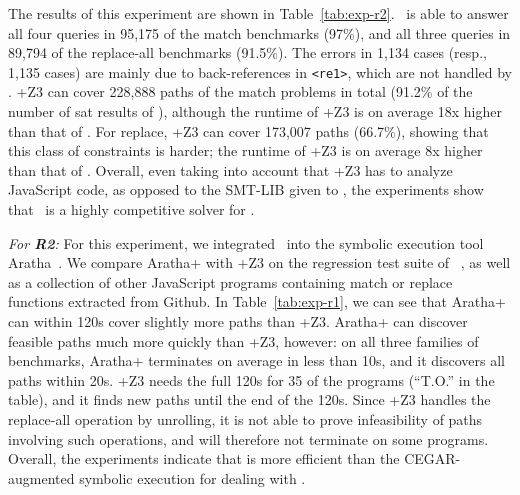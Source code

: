 The results of this experiment are shown in
Table~\ref{tab:exp-r2}. \ostrich\ is able to answer all four queries
in 95,175 of the match benchmarks (97\%), and all three queries in
89,794 of the replace-all benchmarks (91.5\%). The errors in 1,134
cases (resp., 1,135 cases) are mainly due to back-references in
\verb!<re1>!, which are not handled by \ostrich. \expose{}+Z3 can
cover 228,888 paths of the match problems in total (91.2\% of the
number of sat results of \ostrich), although the runtime of
\expose{}+Z3 is on average 18x higher than that of \ostrich. For
replace, \expose{}+Z3 can cover 173,007 paths (66.7\%), showing that
this class of constraints is harder; the runtime of \expose{}+Z3 is on
average 8x higher than that of \ostrich.  Overall, even taking into
account that \expose{}+Z3 has to analyze JavaScript code, as opposed
to the SMT-LIB given to \ostrich, the experiments show that \ostrich\
is a highly competitive solver for \regexps.

\smallskip
{\em For \textbf{R2}:} For this experiment,
we  integrated \ostrich\ into the symbolic
execution tool Aratha~\cite{aratha}.  We compare Aratha+{\ostrich} with
\expose{}+Z3 on the regression test suite of \expose{}~\cite{DBLP:conf/spin/LoringMK17},
as well as a collection of other JavaScript programs containing match or replace
functions extracted from Github. In
Table~\ref{tab:exp-r1}, we can see that Aratha+{\ostrich} can within
120s cover slightly more paths than \expose{}+Z3. Aratha+{\ostrich} can
discover feasible paths much more quickly than \expose{}+Z3, however: on
all three families of benchmarks, Aratha+{\ostrich} terminates on
average in less than 10s, and it discovers all paths 
within 20s. \expose{}+Z3 needs the full 120s for
35 of the programs (``T.O.'' in the table),
and it finds new paths until the end of the 120s. Since \expose{}+Z3
handles the replace-all operation by unrolling, it is not able to
prove infeasibility of paths involving such operations, and will
therefore not terminate on some programs.
Overall, the experiments indicate that {\ostrich} is more
efficient than the CEGAR-augmented symbolic execution for dealing
with \regexps.



